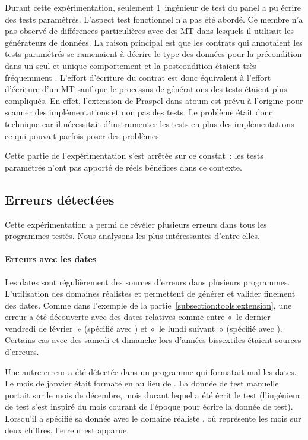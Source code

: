 Durant cette expérimentation, seulement 1~ingénieur de test du panel a pu écrire
des tests paramétrés. L'aspect test fonctionnel n'a pas été abordé. Ce membre
n'a pas observé de différences particulières avec des MT dans lesquels il
utilisait les générateurs de données. La raison principal est que les contrats
qui annotaient les tests paramétrés se ramenaient à décrire le type des données
pour la précondition dans un seul et unique comportement et la postcondition
étaient très fréquemment . L'effort d'écriture du contrat
est donc équivalent à l'effort d'écriture d'un MT sauf que le processus de
générations des tests étaient plus compliqués. En effet, l'extension de Praspel
dans atoum est prévu à l'origine pour scanner des implémentations et non pas des
tests. Le problème était donc technique car il nécessitait d'instrumenter les
tests en plus des implémentations ce qui pouvait parfois poser des problèmes.

Cette partie de l'expérimentation s'est arrêtée sur ce constat~: les tests
paramétrés n'ont pas apporté de réels bénéfices dans ce contexte.

\subsection{Erreurs détectées}
\label{subsection:experimentation:errors}

Cette expérimentation a permi de révéler plusieurs erreurs dans tous les
programmes testés. Nous analysons les plus intéressantes d'entre elles.

\paragraph{Erreurs avec les dates} Les dates sont régulièrement des sources
d'erreurs dans plusieurs programmes. L'utilisation des domaines réalistes
 et  permettent de générer et valider finement des
dates. Comme dans l'exemple de la partie~\ref{subsection:tools:extension}, une
erreur a été découverte avec des dates relatives comme entre «~le dernier
vendredi de février~» (spécifié avec ) et «~le lundi suivant~» (spécifié avec ). Certains cas avec des samedi et dimanche lors d'années
bissextiles étaient sources d'erreurs.

Une autre erreur a été détectée dans un programme qui formatait mal les dates.
Le mois de janvier était formaté en  au lieu de . La donnée de
test manuelle portait sur le mois de décembre, mois durant lequel a été écrit le
test (l'ingénieur de test s'est inspiré du mois courant de l'époque pour écrire
la donnée de test). Lorsqu'il a spécifié sa donnée avec le domaine réaliste
, où  représente les mois sur deux chiffres, l'erreur
est apparue.

